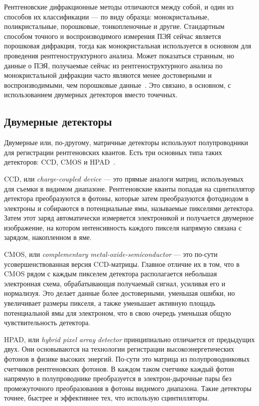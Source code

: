 \documentclass[a4paper,14pt]{extarticle}
\newcounter{x}
\begin{document}
Рентгеновские дифракционные методы отличаются между собой, и один из способов их классификации --- по виду образца: монокристальные, поликристальные, порошковые, тонкопленочные и другие.
Стандартным способом точного и воспроизводимого измерения ПЭЯ сейчас является порошковая дифракция, тогда как монокристальная используется в основном для проведения рентгеноструктурного анализа.
Может показаться странным, но данные о ПЭЯ, получаемые сейчас из рентгеноструктурного анализа по монокристальной дифракции часто являются менее достоверными и воспроизводимыми, чем порошковые данные~\cite{Dudka:2017}.
Это связано, в основном, с использованием двумерных детекторов вместо точечных.

\subsection{Двумерные детекторы}

Двумерные или, по-другому, матричные детекторы используют полупроводники для регистрации рентгеновских квантов.
Есть три основных типа таких детекторов: CCD, CMOS и HPAD~\cite{Alle:2016}.

CCD, или \textit{charge-coupled device} --- это прямые аналоги матриц, используемых для съемки в видимом диапазоне.
Рентгеновские кванты попадая на сцинтиллятор детектора преобразуются в фотоны, которые затем преобразуются фотодиодом в электроны и собираются в потенциальные ямы, называемые пикселями детектора.
Затем этот заряд автоматически измеряется электроникой и получается двумерное изображение, на котором интенсивность каждого пикселя напрямую связана с зарядом, накопленном в яме.

CMOS, или \textit{complementary metal-oxide-semiconductor} --- это по-сути усовершенствованная версия CCD-матрицы.
Главное отличие их в том, что в CMOS рядом с каждым пикселем детектора располагается небольшая электронная схема, обрабатывающая получаемый сигнал, усиливая его и нормализуя.
Это делает данные более достоверными, уменьшая ошибки, но увеличивает размеры пикселя, а также уменьшает активную площадь потенциальной ямы для электроном, что в свою очередь уменьшая общую чувствительность детектора.

HPAD, или \textit{hybrid pixel array detector} принципиально отличается от предыдущих двух.
Они основываются на технологии регистрации высокоэнергетических фотонов в физике высоких энергий.
По-сути это матрица из полупроводниковых счетчиков рентгеновских фотонов.
В каждом таком счетчике каждый фотон напрямую в полупроводнике преобразуется в электрон-дырочные пары без промежуточного преобразования в фотоны видимого диапазона.
Такие детекторы точнее, быстрее и эффективнее тех, что использую сцинтилляторы.
\end{document}
